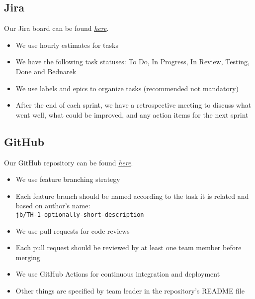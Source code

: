 \documentclass[12pt]{article}
\begin{document}
\subsection{Jira}
Our Jira board can be found \href{https://table-hub.atlassian.net/jira/software/projects/TH/boards/1}{\textit{here}}.
\begin{itemize}
    \item We use hourly estimates for tasks
    \item We have the following task statuses: To Do, In Progress, In Review, Testing, Done and Bednarek
    \item We use labels and epics to organize tasks (recommended not mandatory)
    \item After the end of each sprint, we have a retrospective meeting to discuss what went well, what could be improved, and any action items for the next sprint
\end{itemize}
\subsection{GitHub}
Our GitHub repository can be found \href{https://github.com/Table-Hub-TUL}{\textit{here}}.
\begin{itemize}
    \item We use feature branching strategy
    \item Each feature branch should be named according to the task it is related and based on author's name: \\ \texttt{jb/TH-1-optionally-short-description}
    \item We use pull requests for code reviews
    \item Each pull request should be reviewed by at least one team member before merging
    \item We use GitHub Actions for continuous integration and deployment
    \item Other things are specified by team leader in the repository's README file
\end{itemize}
\end{document}

